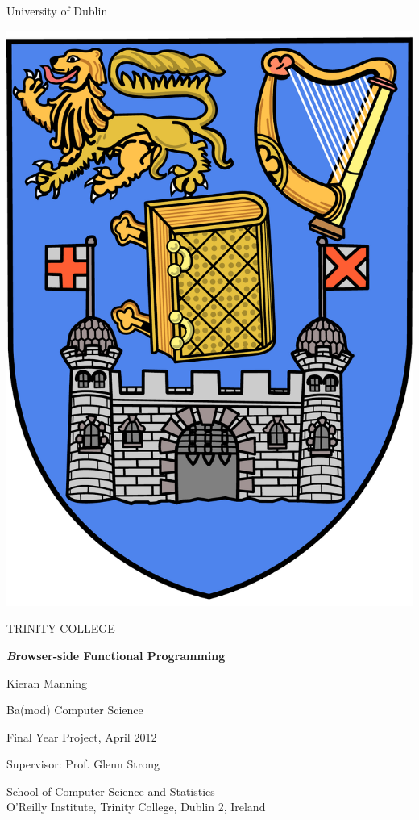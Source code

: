 
    
\thispagestyle{empty}
\begin{center}
{\sffamily
{\huge University of Dublin}
 
\vspace{10pt}
 
\includegraphics[scale=0.1]{trinitycollege.pdf}
 
\vspace{10pt}
 
{\Huge TRINITY COLLEGE}
 
\vspace{60pt}
 
\textbf{ \Large \emph Browser-side Functional Programming}
 
\vspace{20pt}
 
Kieran Manning
 
\vspace{20pt}
 
Ba(mod) Computer Science
 
Final Year Project, April 2012
 
Supervisor: Prof. Glenn Strong
 
\vspace{100pt}
 
School of Computer Science and Statistics \\
O'Reilly Institute, Trinity College, Dublin 2, Ireland
}
\end{center}

